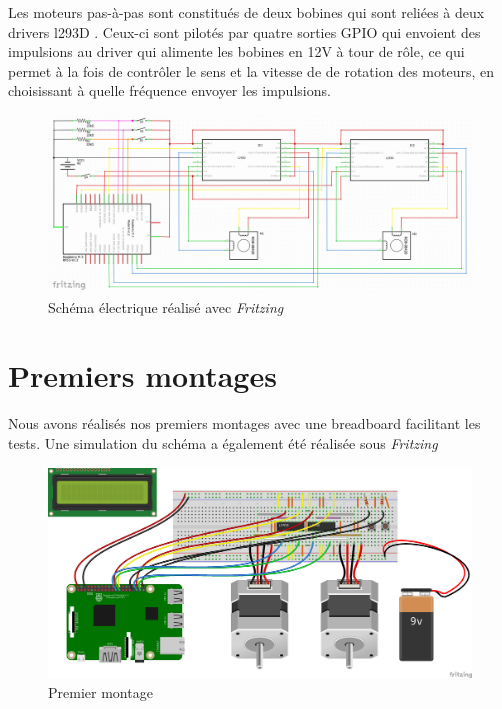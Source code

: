 \documentclass[12pt,a4paper]{report}
\begin{document}
Les moteurs pas-à-pas sont constitués de deux bobines qui sont reliées à deux drivers l293D . Ceux-ci sont pilotés par quatre sorties GPIO qui envoient des impulsions au driver qui alimente les bobines en 12V à tour de rôle, ce qui permet à la fois de contrôler le sens et la vitesse de de rotation des moteurs, en choisissant à quelle fréquence envoyer les impulsions.
\begin{figure}[!h]
 \center
 \includegraphics[scale=0.34]{../pictures/Sudoku_schema_electrique.png}
 \caption{Schéma électrique réalisé avec \emph{Fritzing}}
\end{figure}

\section{Premiers montages}
Nous avons réalisés nos premiers montages avec une breadboard facilitant les tests. Une simulation du schéma a également été réalisée sous \emph{Fritzing}
\begin{figure}[!h]
 \center
 \includegraphics[scale=0.45]{../pictures/Sudoku_schema}
 \caption{Premier montage}
\end{figure}
\end{document}
